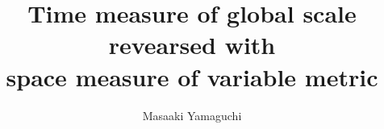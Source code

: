 \documentclass{jsarticle}
\begin{document}
\title{Time measure of global scale revearsed with\\
space measure of variable metric}
\author{Masaaki Yamaguchi}
\date{}
\maketitle
\newcommand{\variint}{%
	\begin{picture}(15,30)
		\put(0,0){
			$ \iint $}
		\put(0,5){\line(15,0){15}}
	\end{picture} %
}
   \newcommand{\squareiint}{%
	\begin{picture}(15,30)
		\put(0,0){
			$ \iint $}
		\put(0,5){$\text{\scalebox{2.0}[1]{$\square$}}$}
	\end{picture} %
}

  
   \newcommand{\dazanier}{%
	\begin{picture}(15,30)
		\put(0,0){
			$ \bigsqcup $}
		\put(4,3){$\text{\scalebox{1.0}[1]{$\top$}}$}
		\put(4,3){$\text{\scalebox{1.0}[1]{$\bot$}}$}
	\end{picture} %
}


\newcommand{\variiint}{%
	\begin{picture}(15,15)
		\put(0,0){
			$ \iiint $}
		\put(0,5){\line(15,0){20}}
	\end{picture} %
}



 \newcommand{\alearletter}{%
	 \begin{picture}(10,20)
		 \put(0,0){
			 $ \square $}
		 \put(0,0){\line(1,1){10}}
	 \end{picture} %
	 }

  \newcommand{\whitewithbodercircle}
  {\text{\textcircled{\phantom{\textbullet}}}
  \kern-0.9em\text{\textcircled{\phantom{}}}}
     

 
  \newcommand{\whitewithblack}{\text{\textcircled{\textbullet}}}
  \newcommand{\whitewithblacksquare}{\text{\fbox{\text{\rule{0.5em}
  {0.5em}}}}}
  \newcommand{\whitewithwhitesquare}{\text{\fbox{\text{\phantom
  {\rule{0.5em}{0.5em}}}}}}
 \newcommand{\whitewithbodercircleiiint}{%
	 \begin{picture}(30,45)
		 \put(0,0){\scalebox{2.0}[2]{$\whitewithbodercircle$}}
		 \put(0,0){\scalebox{2.0}[2]{$\iiint$}}
	 \end{picture}%
	 }
\newcommand{\whitewithbodercircleint}{%
	 \begin{picture}(30,45)
		 \put(0,0){\scalebox{2.0}[2]{$\whitewithbodercircle$}}
		 \put(0,0){\scalebox{2.0}[2]{$\int$}}
	 \end{picture}%
	 }
 \newcommand{\whitewithbodercirclevarint}{%
	 \begin{picture}(30,45)
		 \put(0,0){\scalebox{2.0}[2]{$\whitewithbodercircle$}}
		 \put(0,0){\scalebox{2.0}[2]{$\varint$}}
	 \end{picture}%
	 }
 
\end{document}
